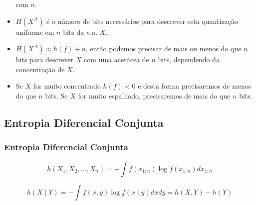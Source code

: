 \begin{frame}[allowframebreaks]
\begin{itemize}
	com $n$.
  \item $H(X^\Delta)$ é o número de bits necessários para descrever esta quantização uniforme em $n$ bits
	da v.a. $X$.
  \item $H(X^\Delta) \approx h(f) + n$, então podemos precisar de mais ou menos do que $n$ bits para descrever $X$
	com uma acerácea de $n$ bits, dependendo da concentração de $X$.
  \item Se $X$ for muito concentrado $h(f) < 0$ e desta forma precisaremos de menos do que $n$ bits.
	Se $X$ for muito espalhado, precisaremos de mais do que $n$ bits.
  \end{itemize}
\end{frame}


\subsection{Entropia Diferencial Conjunta}
\begin{frame}[allowframebreaks]
  \frametitle{Entropia Diferencial Conjunta}
  \begin{definition}
  \begin{equation}
  h(X_1, X_2, \ldots, X_n) = - \int f(x_{1:n}) \log f(x_{1:n}) d x_{1:n}
  \end{equation}
  \end{definition}

  \begin{definition}
  \begin{equation}
  h(X \mid Y) = - \int f(x,y) \log f(x \mid y) dx dy = h(X,Y) - h(Y)
  \end{equation}
  \end{definition}

\end{frame}


